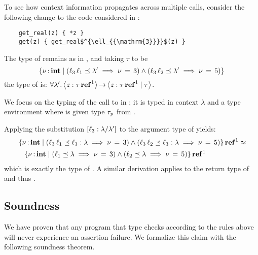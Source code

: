 \begin{example}[2-CFA]
  To see how context information propagates across multiple calls, consider
  the following change to the code considered in :
  \begin{lstlisting}
    get_real(z) { *z }
    get(z) { get_real$^{\ell_{{\mathrm{3}}}}$(z) }
  \end{lstlisting}
  The type of  remains as in , and taking $\tau$
  to be \[
     \left\{{  \nu  \operatorname{:} \mathbf{int} \mid   (    \ell_{{\mathrm{3}}} \, \ell_{{\mathrm{1}}}     \preceq    \lambda'   \implies  \nu \, = \, 3  )  \wedge  (    \ell_{{\mathrm{3}}} \, \ell_{{\mathrm{2}}}     \preceq    \lambda'   \implies  \nu \, = \, 5  )  }\right\} 
  \]
  the type of  is: $ \forall  \lambda' .\left\langle{ \mathit{z}  :   \tau  \operatorname{\mathbf{ref}}^{ 1 }  }\right\rangle\operatorname{\rightarrow}\left\langle{ \mathit{z}  :   \tau  \operatorname{\mathbf{ref}}^{ 1 }  \mid \tau }\right\rangle $.

  We focus on the typing of the call to  in ; it
  is typed in context $\lambda$ and a type environment where
   is given type $\tau_{\mathit{p}}$ from .

  Applying the substitution $[  \ell_{{\mathrm{3}}}  :  \lambda  /  \lambda'  ]$ to the argument
  type of  yields:
  \begin{align*}
    &   \left\{{  \nu  \operatorname{:} \mathbf{int} \mid   (    \ell_{{\mathrm{3}}} \, \ell_{{\mathrm{1}}}     \preceq     \ell_{{\mathrm{3}}}  :  \lambda    \implies  \nu \, = \, 3  )  \wedge  (    \ell_{{\mathrm{3}}} \, \ell_{{\mathrm{2}}}     \preceq     \ell_{{\mathrm{3}}}  :  \lambda    \implies  \nu \, = \, 5  )  }\right\}   \operatorname{\mathbf{ref}}^{ 1 }  \approx  \\
    & \,\,\,\,\,   \left\{{  \nu  \operatorname{:} \mathbf{int} \mid   (    \ell_{{\mathrm{1}}}     \preceq    \lambda   \implies  \nu \, = \, 3  )  \wedge  (    \ell_{{\mathrm{2}}}     \preceq    \lambda   \implies  \nu \, = \, 5  )  }\right\}   \operatorname{\mathbf{ref}}^{ 1 } 
  \end{align*}
  which is exactly the type of .
  A similar derivation applies to
  the return type of  and thus .
\end{example}

\subsection{Soundness}
\label{sec:soundness}
We have proven that any program that type checks according to
the rules above will never experience an assertion failure.
We formalize this claim with the following soundness theorem.

